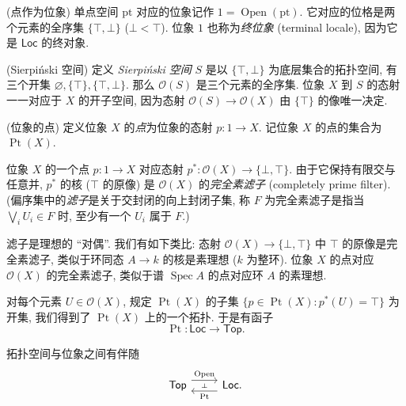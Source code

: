 \begin{example}
	{(点作为位象)}
	单点空间 $\text{pt}$ 对应的位象记作 $1 = \operatorname{Open}(\text{pt})$.
	它对应的位格是两个元素的全序集 $\{\top,\bot\}$ ($\bot < \top$).
	位象 $1$ 也称为\emph{终位象} (terminal locale), 因为它是 $\mathsf {Loc}$ 的终对象.
\end{example}

\begin{example}
	{(Sierpi\'nski 空间)}
	定义 \emph{Sierpi\'nski 空间} $S$ 是以 $\{\top,\bot\}$ 为底层集合的拓扑空间, 有三个开集 $\varnothing, \{\top\}, \{\top,\bot\}$. 那么 $\mathcal O(S)$ 是三个元素的全序集.
	位象 $X$ 到 $S$ 的态射一一对应于 $X$ 的开子空间, 因为\fm{}态射  $\mathcal O(S)\to\mathcal O(X)$ 由 $\{\top\}$ 的像唯一决定.
\end{example}


\begin{definition}
	[label={points-of-locale}]
	{(位象的点)}
	定义位象 $X$ 的\emph{点}为位象的态射 $p\colon 1 \to X$.
	记位象 $X$ 的点的集合为 $\operatorname{Pt}(X)$.
\end{definition}

位象 $X$ 的一个点 $p\colon 1 \to X$ 对应\fm{}态射 $p^*\colon \mathcal O(X) \to \{\bot,\top\}$.
由于它保持有限交与任意并, $p^*$ 的核 ($\top$ 的原像) 是 $\mathcal O(X)$ 的\emph{完全素滤子} (completely prime filter). (偏序集中的\emph{滤子}是关于交封闭的向上封闭子集, 称 $F$ 为完全素滤子是指当 $\bigvee_i U_i \in F$ 时, 至少有一个 $U_i$ 属于 $F$.)

\begin{remark}
	[label={completely-prime-filter-vs-prime-ideal}]
	{}
	滤子是理想的 ``对偶''. 我们有如下类比: 态射 $\mathcal O(X)\to \{\bot,\top\}$ 中 $\top$ 的原像是完全素滤子, 类似于环同态 $A\to k$ 的核是素理想 ($k$ 为整环). 位象 $X$ 的点对应 $\mathcal O(X)$ 的完全素滤子, 类似于谱 $\operatorname{Spec}A$ 的点对应环 $A$ 的素理想.
\end{remark}

对每个元素 $U\in\mathcal O(X)$, 规定 $\operatorname{Pt}(X)$ 的子集
$\{p \in \operatorname{Pt}(X) \colon p^*(U) = \top\}$ 为开集,
我们得到了 $\operatorname{Pt}(X)$ 上的一个拓扑. 于是有函子
$$\operatorname{Pt} \colon \mathsf {Loc} \to \mathsf {Top}.$$

\begin{prop}
	[label={top-loc-adjunction}]
	{}
	拓扑空间与位象之间有伴随
	\[\begin{tikzcd}[ampersand replacement=\&]
		{\mathsf {Top}} \& {\mathsf {Loc}.}
		\arrow[""{name=0, anchor=center, inner sep=0}, "{\operatorname{Open}}", shift left=2, from=1-1, to=1-2]
		\arrow[""{name=1, anchor=center, inner sep=0}, "{\operatorname{Pt}}", shift left=2, from=1-2, to=1-1]
		\arrow["\dashv"{anchor=center, rotate=-90}, draw=none, from=0, to=1]
	\end{tikzcd}\]
\end{prop}

